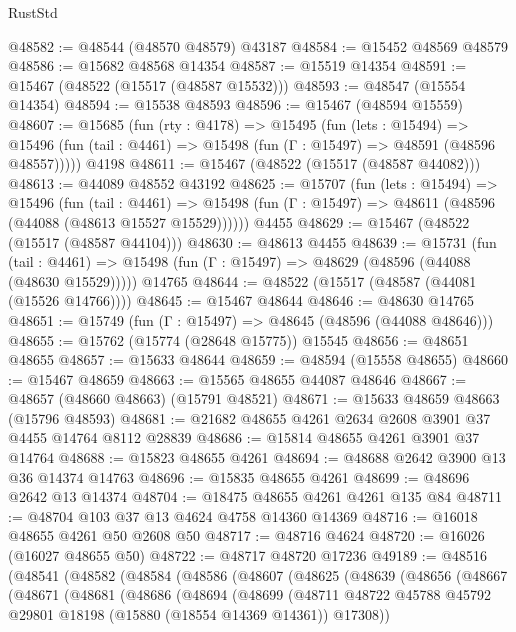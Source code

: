 \begin{lexlean}{RustStd}
\begin{coremodule}
@48582 := @48544 (@48570 @48579) @43187
@48584 := @15452 @48569 @48579
@48586 := @15682 @48568 @14354
@48587 := @15519 @14354
@48591 := @15467 (@48522 (@15517 (@48587 @15532)))
@48593 := @48547 (@15554 @14354)
@48594 := @15538 @48593
@48596 := @15467 (@48594 @15559)
@48607 := @15685
    (fun (rty : @4178) =>
    @15495
      (fun (lets : @15494) =>
      @15496 (fun (tail : @4461) => @15498 (fun (Γ : @15497) => @48591 (@48596 @48557)))))
    @4198
@48611 := @15467 (@48522 (@15517 (@48587 @44082)))
@48613 := @44089 @48552 @43192
@48625 := @15707
    (fun (lets : @15494) =>
    @15496
      (fun (tail : @4461) =>
      @15498 (fun (Γ : @15497) => @48611 (@48596 (@44088 (@48613 @15527 @15529))))))
    @4455
@48629 := @15467 (@48522 (@15517 (@48587 @44104)))
@48630 := @48613 @4455
@48639 := @15731
    (fun (tail : @4461) => @15498 (fun (Γ : @15497) => @48629 (@48596 (@44088 (@48630 @15529)))))
    @14765
@48644 := @48522 (@15517 (@48587 (@44081 (@15526 @14766))))
@48645 := @15467 @48644
@48646 := @48630 @14765
@48651 := @15749 (fun (Γ : @15497) => @48645 (@48596 (@44088 @48646)))
@48655 := @15762 (@15774 (@28648 @15775)) @15545
@48656 := @48651 @48655
@48657 := @15633 @48644
@48659 := @48594 (@15558 @48655)
@48660 := @15467 @48659
@48663 := @15565 @48655 @44087 @48646
@48667 := @48657 (@48660 @48663) (@15791 @48521)
@48671 := @15633 @48659 @48663 (@15796 @48593)
@48681 := @21682 @48655 @4261 @2634 @2608 @3901 @37 @4455 @14764 @8112 @28839
@48686 := @15814 @48655 @4261 @3901 @37 @14764
@48688 := @15823 @48655 @4261
@48694 := @48688 @2642 @3900 @13 @36 @14374 @14763
@48696 := @15835 @48655 @4261
@48699 := @48696 @2642 @13 @14374
@48704 := @18475 @48655 @4261 @4261 @135 @84
@48711 := @48704 @103 @37 @13 @4624 @4758 @14360 @14369
@48716 := @16018 @48655 @4261 @50 @2608 @50
@48717 := @48716 @4624
@48720 := @16026 (@16027 @48655 @50)
@48722 := @48717 @48720 @17236
@49189 := @48516
    (@48541
      (@48582
        (@48584
          (@48586
            (@48607
              (@48625
                (@48639
                  (@48656
                    (@48667
                      (@48671
                        (@48681
                          (@48686
                            (@48694
                              (@48699
                                (@48711
                                  @48722
                                  @45788
                                  @45792
                                  @29801
                                  @18198
                                  (@15880 (@18554 @14369 @14361))
                                  @17308))

\end{coremodule}
\end{lexlean}

